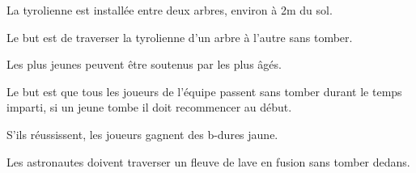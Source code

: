 \documentclass{grand-jeu}
\begin{document}
\begin{liste-materiel}
\end{liste-materiel}

\begin{regles}
La tyrolienne est installée entre deux arbres, environ à 2m du sol. 

Le but est de traverser la tyrolienne d'un arbre à l'autre sans tomber. 

Les plus jeunes peuvent être soutenus par les plus âgés. 

Le but est que tous les joueurs de l'équipe passent sans tomber durant le temps imparti, si un jeune tombe il doit recommencer au début.

S’ils réussissent, les joueurs gagnent des b-dures jaune. 
\end{regles}

\begin{imaginaire}
Les astronautes doivent traverser un fleuve de lave en fusion sans tomber dedans. 
\end{imaginaire}

\begin{moments-stop}
\end{moments-stop}
\end{document}
